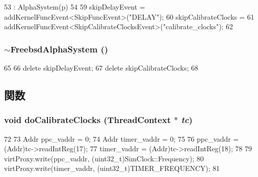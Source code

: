 \begin{DoxyCode}
53     : AlphaSystem(p)
54 {
59     skipDelayEvent = addKernelFuncEvent<SkipFuncEvent>("DELAY");
60     skipCalibrateClocks =
61         addKernelFuncEvent<SkipCalibrateClocksEvent>("calibrate_clocks");
62 }
\end{DoxyCode}
\hypertarget{classFreebsdAlphaSystem_aa3f37711630003ea2bb338a3b3fdea06}{
\subsubsection[{$\sim$FreebsdAlphaSystem}]{\setlength{\rightskip}{0pt plus 5cm}$\sim${\bf FreebsdAlphaSystem} ()}}
\label{classFreebsdAlphaSystem_aa3f37711630003ea2bb338a3b3fdea06}



\begin{DoxyCode}
65 {
66     delete skipDelayEvent;
67     delete skipCalibrateClocks;
68 }
\end{DoxyCode}


\subsection{関数}
\hypertarget{classFreebsdAlphaSystem_a7a774b4d4617a0112a06be6f030dc9f5}{
\subsubsection[{doCalibrateClocks}]{\setlength{\rightskip}{0pt plus 5cm}void doCalibrateClocks ({\bf ThreadContext} $\ast$ {\em tc})}}
\label{classFreebsdAlphaSystem_a7a774b4d4617a0112a06be6f030dc9f5}



\begin{DoxyCode}
72 {
73     Addr ppc_vaddr = 0;
74     Addr timer_vaddr = 0;
75 
76     ppc_vaddr = (Addr)tc->readIntReg(17);
77     timer_vaddr = (Addr)tc->readIntReg(18);
78 
79     virtProxy.write(ppc_vaddr, (uint32_t)SimClock::Frequency);
80     virtProxy.write(timer_vaddr, (uint32_t)TIMER_FREQUENCY);
81 }
\end{DoxyCode}


